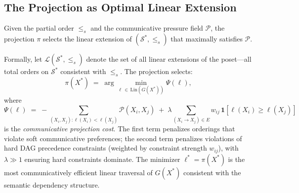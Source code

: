 \documentclass[11pt, a4paper]{article}
\theoremstyle{srn}
\theoremstyle{srnremark}
\begin{document}
\subsection{The Projection as Optimal Linear Extension}

Given the partial order $\leq_s$ and the communicative pressure field
$\mathcal{P}$, the projection $\pi$ selects the linear extension of
$(\mathcal{S}^*, \leq_s)$ that maximally satisfies $\mathcal{P}$.

Formally, let $\mathcal{L}(\mathcal{S}^*, \leq_s)$ denote the set of
all linear extensions of the poset---all total orders on
$\mathcal{S}^*$ consistent with $\leq_s$.
The projection selects:
\begin{equation}
  \label{eq:projection}
  \pi(X^*)
  \;=\;
  \arg\min_{\ell \,\in\, \mathrm{Lin}(G(X^*))}
  \Psi(\ell),
\end{equation}
where
\begin{equation}
  \label{eq:psi}
  \Psi(\ell)
  \;=\;
  -\!\sum_{(X_i, X_j) : \ell(X_i) < \ell(X_j)}
  \mathcal{P}(X_i, X_j)
  \;+\;
  \lambda \sum_{(X_i \to X_j) \in E}
  w_{ij}\,\mathbf{1}[\ell(X_i) \geq \ell(X_j)]
\end{equation}
is the \emph{communicative projection cost}.
The first term penalizes orderings that violate soft communicative
preferences; the second term penalizes violations of hard DAG
precedence constraints (weighted by constraint strength $w_{ij}$),
with $\lambda \gg 1$ ensuring hard constraints dominate.
The minimizer $\ell^* = \pi(X^*)$ is the most communicatively
efficient linear traversal of $G(X^*)$ consistent with the semantic
dependency structure.
\end{document}
